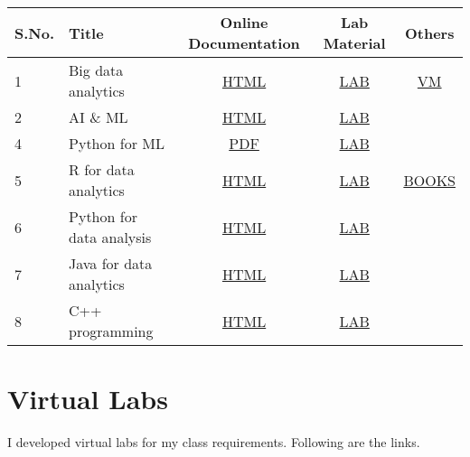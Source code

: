 \documentclass[10pt]{article}
\begin{document}
\begin{table}[ht]
\centering 
\begin{tabular}{llccc} \hline 
S.No. & Title & Online Documentation & Lab Material & Others \\ \hline 
1 &  Big data analytics & \href{https://kamakshaiah.github.io/hadoop-kichidi/}{HTML} & \href{https://github.com/Kamakshaiah/hadoop-lab-1}{LAB} & \href{https://github.com/Kamakshaiah/Sdoop}{VM} \\
2 &  AI \& ML & \href{https://kamakshaiah.github.io/aiml-book/ai}{HTML} & \href{https://github.com/Kamakshaiah/aiml-lab}{LAB} \\
4 &  Python for ML & \href{https://github.com/Kamakshaiah/python-for-ml/blob/main/ml.pdf}{PDF} & \href{https://github.com/Kamakshaiah/python-for-ml}{LAB} \\

5 &  R for data analytics & \href{}{HTML} & \href{https://github.com/Kamakshaiah/R-Lab}{LAB} & \href{https://www.amazon.com/~/e/B08C7SVM7V}{BOOKS} \\
6 &  Python for data analysis & \href{}{HTML} & \href{https://github.com/Kamakshaiah/python-lab/}{LAB} & \\
7 &  Java for data analytics & \href{https://kamakshaiah.github.io/java-book/}{HTML} & \href{https://github.com/Kamakshaiah/Java-Exercises}{LAB} &  \\
8 &  C++ programming & \href{https://kamakshaiah.github.io/cpp-book/cpp}{HTML} & \href{https://github.com/Kamakshaiah/cpp-exercises}{LAB} & \\ \hline 

\end{tabular}
\end{table}

\section{\bfseries{Virtual Labs}} \hline \vspace{0.5cm}
\label{vlabs} 
I developed virtual labs for my class requirements. Following are the links. 
\end{document}
